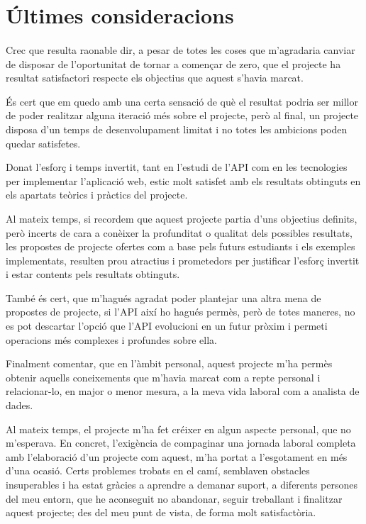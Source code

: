 \section{Últimes consideracions}

    \paragraph{}
    Crec que resulta raonable dir, a pesar de totes les coses que m’agradaria canviar de disposar de l’oportunitat de tornar a començar de zero, que el projecte ha resultat satisfactori respecte els objectius que aquest s’havia marcat.

    És cert que em quedo amb una certa sensació de què el resultat podria ser millor de poder realitzar alguna iteració més sobre el projecte, però al final, un projecte disposa d’un temps de desenvolupament limitat i no totes les ambicions poden quedar satisfetes.

    Donat l’esforç i temps invertit, tant en l’estudi de l’API com en les tecnologies per implementar l’aplicació web, estic molt satisfet amb els resultats obtinguts en els apartats teòrics i pràctics del projecte.

    Al mateix temps, si recordem que aquest projecte partia d’uns objectius definits, però incerts de cara a conèixer la profunditat o qualitat dels possibles resultats, les propostes de projecte ofertes com a base pels futurs estudiants i els exemples implementats, resulten prou atractius i prometedors per justificar l’esforç invertit i estar contents pels resultats obtinguts.

    També és cert, que m’hagués agradat poder plantejar una altra mena de propostes de projecte, si l’API així ho hagués permès, però de totes maneres, no es pot descartar l’opció que l’API evolucioni en un futur pròxim i permeti operacions més complexes  i profundes sobre ella.

    Finalment comentar, que en l’àmbit personal, aquest projecte m’ha permès obtenir aquells coneixements que m’havia marcat com a repte personal i relacionar-lo, en major o menor mesura, a la meva vida laboral com a analista de dades.

    Al mateix temps, el projecte m’ha fet créixer en algun aspecte personal, que no m’esperava. En concret, l’exigència de compaginar una jornada laboral completa amb l’elaboració d’un projecte com aquest, m’ha portat a l’esgotament en més d’una ocasió. Certs problemes trobats en el camí, semblaven obstacles insuperables i ha estat gràcies a aprendre a demanar suport, a diferents persones del meu entorn, que he aconseguit no abandonar, seguir treballant i finalitzar aquest projecte; des del meu punt de vista, de forma molt satisfactòria.
